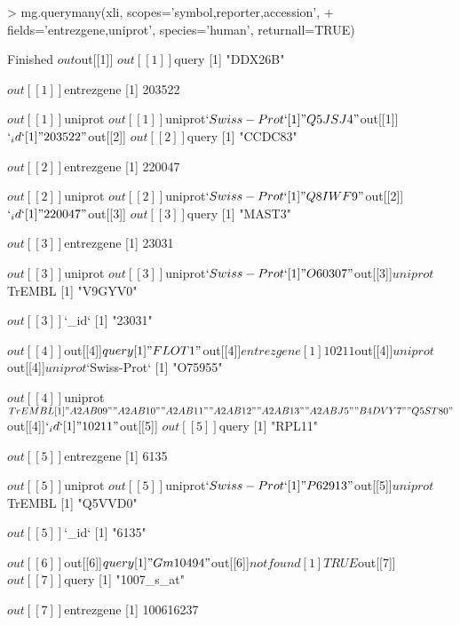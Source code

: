 \documentclass[12pt]{article}
\begin{document}
\begin{Schunk}
\begin{Sinput}
> mg.querymany(xli, scopes='symbol,reporter,accession', 
+              fields='entrezgene,uniprot', species='human', returnall=TRUE)
\end{Sinput}
\begin{Soutput}
Finished
$out
$out[[1]]
$out[[1]]$query
[1] "DDX26B"

$out[[1]]$entrezgene
[1] 203522

$out[[1]]$uniprot
$out[[1]]$uniprot$`Swiss-Prot`
[1] "Q5JSJ4"


$out[[1]]$`_id`
[1] "203522"


$out[[2]]
$out[[2]]$query
[1] "CCDC83"

$out[[2]]$entrezgene
[1] 220047

$out[[2]]$uniprot
$out[[2]]$uniprot$`Swiss-Prot`
[1] "Q8IWF9"


$out[[2]]$`_id`
[1] "220047"


$out[[3]]
$out[[3]]$query
[1] "MAST3"

$out[[3]]$entrezgene
[1] 23031

$out[[3]]$uniprot
$out[[3]]$uniprot$`Swiss-Prot`
[1] "O60307"

$out[[3]]$uniprot$TrEMBL
[1] "V9GYV0"


$out[[3]]$`_id`
[1] "23031"


$out[[4]]
$out[[4]]$query
[1] "FLOT1"

$out[[4]]$entrezgene
[1] 10211

$out[[4]]$uniprot
$out[[4]]$uniprot$`Swiss-Prot`
[1] "O75955"

$out[[4]]$uniprot$TrEMBL
[1] "A2AB09" "A2AB10" "A2AB11" "A2AB12" "A2AB13" "A2ABJ5" "B4DVY7" "Q5ST80"


$out[[4]]$`_id`
[1] "10211"


$out[[5]]
$out[[5]]$query
[1] "RPL11"

$out[[5]]$entrezgene
[1] 6135

$out[[5]]$uniprot
$out[[5]]$uniprot$`Swiss-Prot`
[1] "P62913"

$out[[5]]$uniprot$TrEMBL
[1] "Q5VVD0"


$out[[5]]$`_id`
[1] "6135"


$out[[6]]
$out[[6]]$query
[1] "Gm10494"

$out[[6]]$notfound
[1] TRUE


$out[[7]]
$out[[7]]$query
[1] "1007_s_at"

$out[[7]]$entrezgene
[1] 100616237


\end{Soutput}
\end{Schunk}
\end{document}

